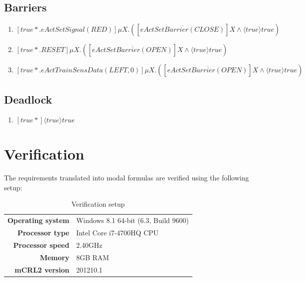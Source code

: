 \documentclass[10pt,a4paper]{article}
\begin{document}
\subsection{Barriers}
\begin{enumerate}[resume]
\item $[true*.eActSetSignal(RED)]\mu X.([\overline{eActSetBarrier(CLOSE)}]X \wedge \langle true \rangle true)$
\item $[true*.RESET]\mu X.([\overline{eActSetBarrier(OPEN)}]X \wedge \langle true\rangle  true)$
\item $[true*.eActTrainSensData(LEFT,0)]\mu X.([\overline{eActSetBarrier(OPEN)}]X \wedge \langle true \rangle  true)$
\end{enumerate}
\subsection{Deadlock}
\begin{enumerate}[resume]
\item $[true*]\langle true \rangle true$
\end{enumerate}


\newpage

\section{Verification}

The requirements translated into modal formulas are verified using the following setup:
\begin{table}[!hbp]
	\centering
	\begin{adjustwidth}{2 cm}{}
	\begin{tabular}{r|l}
	\textbf{Operating system}&Windows 8.1 64-bit (6.3, Build 9600)\\
	\textbf{Processor type}& Intel Core i7-4700HQ CPU\\
	\textbf{Processor speed}& 2.40GHz\\
	\textbf{Memory}& 8GB RAM\\
	\textbf{mCRL2 version}& 201210.1\\
	\end{tabular}
	\end{adjustwidth}
	\caption{Verification setup}
\end{table}
\end{document}
